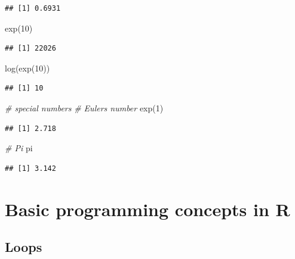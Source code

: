 \documentclass[
  12pt,
]{style/krantz}
\newenvironment{Shaded}{\begin{snugshade}}{\end{snugshade}}
\newcommand{\CommentTok}[1]{\textcolor[rgb]{0.56,0.35,0.01}{\textit{#1}}}
\newcommand{\DecValTok}[1]{\textcolor[rgb]{0.00,0.00,0.81}{#1}}
\newcommand{\FunctionTok}[1]{\textcolor[rgb]{0.00,0.00,0.00}{#1}}
\newcommand{\NormalTok}[1]{#1}
\begin{document}
\begin{verbatim}
## [1] 0.6931
\end{verbatim}

\begin{Shaded}
\begin{Highlighting}[]
\FunctionTok{exp}\NormalTok{(}\DecValTok{10}\NormalTok{)}
\end{Highlighting}
\end{Shaded}

\begin{verbatim}
## [1] 22026
\end{verbatim}

\begin{Shaded}
\begin{Highlighting}[]
\FunctionTok{log}\NormalTok{(}\FunctionTok{exp}\NormalTok{(}\DecValTok{10}\NormalTok{))}
\end{Highlighting}
\end{Shaded}

\begin{verbatim}
## [1] 10
\end{verbatim}

\begin{Shaded}
\begin{Highlighting}[]
\CommentTok{\# special numbers}
\CommentTok{\# Euler\textquotesingle{}s number}
\FunctionTok{exp}\NormalTok{(}\DecValTok{1}\NormalTok{)}
\end{Highlighting}
\end{Shaded}

\begin{verbatim}
## [1] 2.718
\end{verbatim}

\begin{Shaded}
\begin{Highlighting}[]
\CommentTok{\# Pi}
\NormalTok{pi}
\end{Highlighting}
\end{Shaded}

\begin{verbatim}
## [1] 3.142
\end{verbatim}

\hypertarget{basic-programming-concepts-in-r}{%
\section{Basic programming concepts in R}\label{basic-programming-concepts-in-r}}

\hypertarget{loops}{%
\subsection{Loops}\label{loops}}
\end{document}
